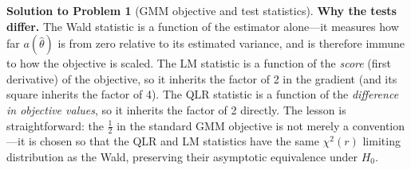 \documentclass[12pt]{article}
\theoremstyle{definition}
\newtheorem{solution}{Solution to Problem}
\begin{document}
\begin{solution}[GMM objective and test statistics]
\medskip
\noindent\textbf{Why the tests differ.} The Wald statistic is a function of the estimator alone---it measures how far $a(\hat\theta)$ is from zero relative to its estimated variance, and is therefore immune to how the objective is scaled. The LM statistic is a function of the \emph{score} (first derivative) of the objective, so it inherits the factor of 2 in the gradient (and its square inherits the factor of 4). The QLR statistic is a function of the \emph{difference in objective values}, so it inherits the factor of 2 directly. The lesson is straightforward: the $\frac{1}{2}$ in the standard GMM objective is not merely a convention---it is chosen so that the QLR and LM statistics have the same $\chi^2(r)$ limiting distribution as the Wald, preserving their asymptotic equivalence under $H_0$.
\end{solution}
\end{document}
